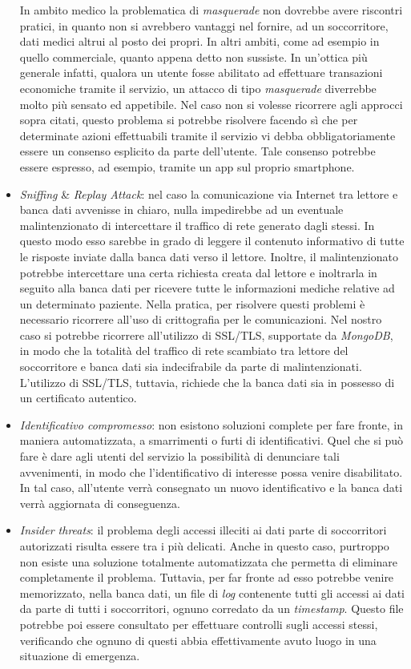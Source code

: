 \documentclass[a4paper,12pt]{report}
\begin{document}
\begin{itemize}
	In ambito medico la problematica di \emph{masquerade} non dovrebbe avere riscontri pratici, in quanto non si avrebbero vantaggi nel fornire, ad un soccorritore, dati medici altrui al posto dei propri. In altri ambiti, come ad esempio in quello commerciale, quanto appena detto non sussiste. In un'ottica più generale infatti, qualora un utente fosse abilitato ad effettuare transazioni economiche tramite il servizio, un attacco di tipo \emph{masquerade} diverrebbe molto più sensato ed appetibile. Nel caso non si volesse ricorrere agli approcci sopra citati, questo problema si potrebbe risolvere facendo sì che per determinate azioni effettuabili tramite il servizio vi debba obbligatoriamente essere un consenso esplicito da parte dell'utente. Tale consenso potrebbe essere espresso, ad esempio, tramite un app sul proprio smartphone. 
	
	\item \emph{Sniffing} \& \emph{Replay Attack}: nel caso la comunicazione via Internet tra lettore e banca dati avvenisse in chiaro, nulla impedirebbe ad un eventuale malintenzionato di intercettare il traffico di rete generato dagli stessi. In questo modo esso sarebbe in grado di leggere il contenuto informativo di tutte le risposte inviate dalla banca dati verso il lettore. Inoltre, il malintenzionato potrebbe intercettare una certa richiesta creata dal lettore e inoltrarla in seguito alla banca dati per ricevere tutte le informazioni mediche relative ad un determinato paziente. Nella pratica, per risolvere questi problemi è necessario ricorrere all'uso di crittografia per le comunicazioni. Nel nostro caso si potrebbe ricorrere all'utilizzo di SSL/TLS, supportate da \emph{MongoDB}, in modo che la totalità del traffico di rete scambiato tra lettore del soccorritore e banca dati sia indecifrabile da parte di malintenzionati. L'utilizzo di SSL/TLS, tuttavia, richiede che la banca dati sia in possesso di un certificato autentico.
	
	\item \emph{Identificativo compromesso}: non esistono soluzioni complete per fare fronte, in maniera automatizzata, a smarrimenti o furti di identificativi. Quel che si può fare è dare agli utenti del servizio la possibilità di denunciare tali avvenimenti, in modo che l'identificativo di interesse possa venire disabilitato. In tal caso, all'utente verrà consegnato un nuovo identificativo e la banca dati verrà aggiornata di conseguenza.
	
	\item \emph{Insider threats}: il problema degli accessi illeciti ai dati parte di soccorritori autorizzati risulta essere tra i più delicati. Anche in questo caso, purtroppo non esiste una soluzione totalmente automatizzata che permetta di eliminare
	completamente il problema. Tuttavia, per far fronte ad esso potrebbe venire memorizzato, nella banca dati, un file di \emph{log} contenente tutti gli accessi ai dati da parte di tutti i soccorritori, ognuno corredato da un \emph{timestamp}. Questo file potrebbe poi essere consultato per effettuare controlli sugli accessi stessi, verificando  che ognuno di questi abbia effettivamente avuto luogo in una situazione di emergenza.
	

\end{itemize}
\end{document}

